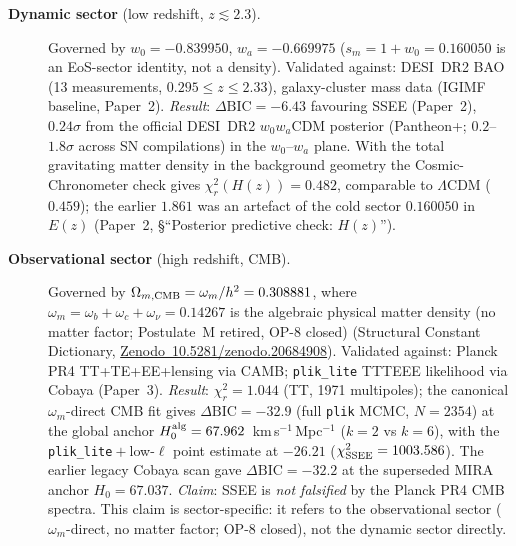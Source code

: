 \documentclass[12pt,a4paper]{article}
\begin{document}
\begin{description}

  \item[\textbf{Dynamic sector} (low redshift, $z\lesssim2.3$).]
  Governed by $w_0=-0.839950$, $w_a=-0.669975$ ($s_m=1+w_0=0.160050$ is an
  EoS-sector identity, not a density).
  Validated against: DESI~DR2 BAO (13 measurements, $0.295\leq z\leq2.33$),
  galaxy-cluster mass data (IGIMF baseline, Paper~2).
  \textit{Result}: $\Delta\mathrm{BIC}=-6.43$ favouring SSEE (Paper~2),
  $0.24\sigma$ from the official DESI~DR2 $w_0w_a$CDM posterior (Pantheon+; $0.2$--$1.8\sigma$ across SN compilations) in the $w_0$--$w_a$ plane.
  With the total gravitating matter density in the background geometry the
  Cosmic-Chronometer check gives $\chi^2_r(H(z))=0.482$, comparable to
  $\Lambda$CDM ($0.459$); the earlier $1.861$ was an artefact of the cold sector
  $0.160050$ in $E(z)$ (Paper~2, \S``Posterior predictive check: $H(z)$'').

  \item[\textbf{Observational sector} (high redshift, CMB).]
  Governed by $\Omega_{m,\rm CMB}=\omega_m/h^2=0.308881$, where
  $\omega_m=\omega_b+\omega_c+\omega_\nu=0.14267$ is the algebraic physical
  matter density (no matter factor; Postulate~M retired, OP-8 closed)
  (Structural Constant Dictionary,
  \href{https://doi.org/10.5281/zenodo.20684908}{Zenodo~10.5281/zenodo.20684908}).
  Validated against: Planck PR4 TT+TE+EE+lensing via CAMB; \texttt{plik\_lite}
  TTTEEE likelihood via Cobaya (Paper~3).
  \textit{Result}: $\chi^2_r=1.044$ (TT, 1971 multipoles);
  the canonical $\omega_m$-direct CMB fit gives $\Delta\mathrm{BIC}=-32.9$
  (full \texttt{plik} MCMC, $N=2354$) at the global anchor
  $H_0^{\rm alg}=67.962$~km\,s$^{-1}$\,Mpc$^{-1}$ ($k=2$ vs $k=6$), with the
  \texttt{plik\_lite}${}+{}$low-$\ell$ point estimate at $-26.21$ ($\chi^2_{\rm SSEE}=1003.586$). The
  earlier legacy Cobaya scan gave $\Delta\mathrm{BIC}=-32.2$ at the superseded
  MIRA anchor $H_0=67.037$.
  \textit{Claim}: SSEE is \emph{not falsified} by the Planck PR4 CMB spectra.
  This claim is sector-specific: it refers to the observational sector
  ($\omega_m$-direct, no matter factor; OP-8 closed), not the dynamic sector directly.


\end{description}
\end{document}
